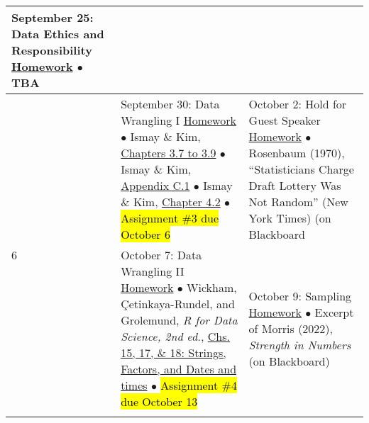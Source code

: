 \documentclass[12pt,letterpaper]{article}
\begin{document}
\begin{tabularx}{\textwidth}{|p{}|p{}||p{}|}
September 25: Data Ethics and Responsibility \newline \newline
\ul{Homework} \newline
$\bullet$ TBA \\


\hline
\multirow{6}{*}{6} &

September 30: Data Wrangling I \newline \newline
\ul{Homework} \newline
$\bullet$ Ismay \& Kim, \href{https://moderndive.com/3-wrangling.html}{Chapters 3.7 to 3.9} \newline
$\bullet$ Ismay \& Kim, \href{https://moderndive.com/C-appendixC.html\#data-wrangling}{Appendix C.1} \newline
$\bullet$ Ismay \& Kim, \href{https://moderndive.com/4-tidy.html}{Chapter 4.2} \newline
$\bullet$ \hl{Assignment \#3 due October 6} &

October 2: Hold for Guest Speaker \newline \newline
\ul{Homework} \newline
$\bullet$ Rosenbaum (1970), ``Statisticians Charge Draft Lottery Was Not Random'' (New York Times) (on Blackboard \\


\hline
\multirow{6}{*}{7} &

October 7: Data Wrangling II \newline \newline
\ul{Homework} \newline
$\bullet$ Wickham, Çetinkaya-Rundel, and Grolemund, \emph{R for Data Science, 2nd ed.}, \href{https://r4ds.hadley.nz/}{Chs. 15, 17, \& 18: Strings, Factors, and Dates and times} \newline
$\bullet$ \hl{Assignment \#4 due October 13} &

October 9: Sampling \newline \newline
\ul{Homework} \newline
$\bullet$ Excerpt of Morris (2022), \emph{Strength in Numbers} (on Blackboard) \\


\hline
\multirow{6}{*}{8} &


\end{tabularx}
\end{document}
